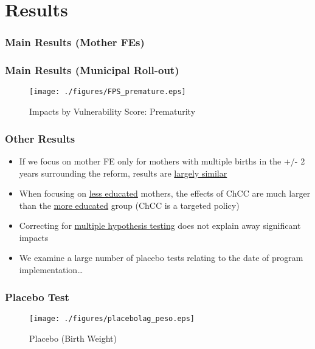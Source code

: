 \documentclass[10pt,letterpaper,subeqn]{beamer}
\begin{document}
\section{Results}
\begin{frame}
\frametitle{Main Results (Mother FEs)}

\end{frame}

\begin{frame}
\frametitle{Main Results (Municipal Roll-out)}
  
\end{frame}

\begin{frame}[label=FSP]
\begin{figure}[htpb!]
  \begin{center}
  \centering
  \caption{Impacts by Vulnerability Score: Prematurity}
  \texttt{[image: ./figures/FPS\_premature.eps]}
\end{center}
\end{figure}
\footnotesize{\hyperlink{FSPapp}{}}
\end{frame}


\begin{frame}[label=Summary]
\frametitle{Other Results}
\begin{itemize}
\item If we focus on mother FE only for mothers with multiple births in the +/- 2 years surrounding the reform, results are \textcolor{blue}{\hyperlink{FE2}{largely similar}}
\item When focusing on \textcolor{blue}{\hyperlink{lowEd}{less educated}} mothers, the effects of ChCC are much larger than the \textcolor{blue}{\hyperlink{highEd}{more educated}} group (ChCC is a targeted policy)
\item Correcting for \textcolor{blue}{\hyperlink{multhyp}{multiple hypothesis testing}} does not explain away significant impacts
\item We examine a large number of placebo tests relating to the date of program implementation\ldots
\end{itemize}

\end{frame}

\begin{frame}[label=Placebo]
\frametitle{Placebo Test}
\begin{figure}[htpb!]
  \begin{center}
  \centering
  \caption{Placebo (Birth Weight)}
  \texttt{[image: ./figures/placebolag\_peso.eps]}
  \label{fig:placebo}
\end{center}
\end{figure}
\vspace{-5mm}
\footnotesize{\hyperlink{allPlacebo}{}}
\end{frame}
\end{document}
